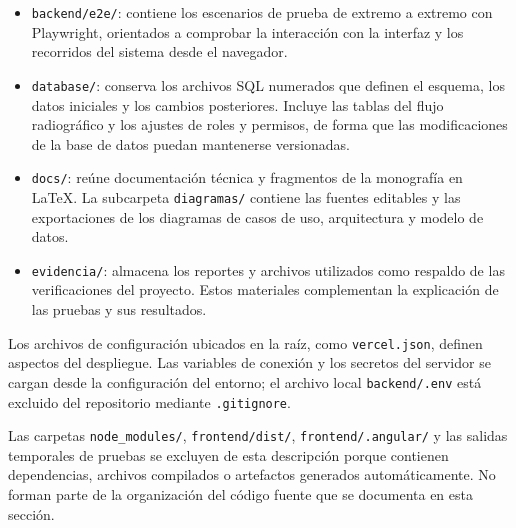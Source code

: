 \begin{itemize}
  \item \texttt{backend/e2e/}: contiene los escenarios de prueba de extremo
  a extremo con Playwright, orientados a comprobar la interacción con la
  interfaz y los recorridos del sistema desde el navegador.

  \item \texttt{database/}: conserva los archivos SQL numerados que definen
  el esquema, los datos iniciales y los cambios posteriores. Incluye las
  tablas del flujo radiográfico y los ajustes de roles y permisos, de forma
  que las modificaciones de la base de datos puedan mantenerse versionadas.

  \item \texttt{docs/}: reúne documentación técnica y fragmentos de la
  monografía en LaTeX. La subcarpeta \texttt{diagramas/} contiene las fuentes
  editables y las exportaciones de los diagramas de casos de uso,
  arquitectura y modelo de datos.

  \item \texttt{evidencia/}: almacena los reportes y archivos utilizados
  como respaldo de las verificaciones del proyecto. Estos materiales
  complementan la explicación de las pruebas y sus resultados.
\end{itemize}

Los archivos de configuración ubicados en la raíz, como
\texttt{vercel.json}, definen aspectos del despliegue. Las variables de
conexión y los secretos del servidor se cargan desde la configuración del
entorno; el archivo local \texttt{backend/.env} está excluido del repositorio
mediante \texttt{.gitignore}.

Las carpetas \texttt{node\_modules/}, \texttt{frontend/dist/},
\texttt{frontend/.angular/} y las salidas temporales de pruebas se excluyen
de esta descripción porque contienen dependencias, archivos compilados o
artefactos generados automáticamente. No forman parte de la organización
del código fuente que se documenta en esta sección.
